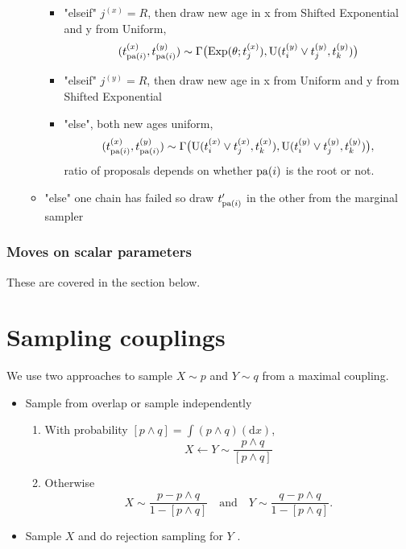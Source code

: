 \documentclass[11pt,a4paper]{article}
\begin{document}
\begin{enumerate}
\begin{itemize}
\begin{itemize}
            \item "elseif" $ j^{(x)} = R $, then draw new age in x from Shifted Exponential and y from Uniform,
            \[
                (t_{\operatorname*{\mathrm{pa}}(i)}^{(x)}, t_{\operatorname*{\mathrm{pa}}(i)}^{(y)}) \sim \Gamma\big(\mathrm{Exp}(\theta; t_j^{(x)}), \mathrm{U}(t_i^{(y)} \vee t_j^{(y)}, t_k^{(y)})\big)
            \]
            \item "elseif" $ j^{(y)} = R $, then draw new age in x from Uniform and y from Shifted Exponential
            \item "else", both new ages uniform,
            \[
                (t_{\operatorname*{\mathrm{pa}}(i)}^{(x)}, t_{\operatorname*{\mathrm{pa}}(i)}^{(y)}) \sim \Gamma\big(\mathrm{U}(t_i^{(x)} \vee t_j^{(x)}, t_k^{(x)}), \mathrm{U}(t_i^{(y)} \vee t_j^{(y)}, t_k^{(y)})\big),
            \]
            ratio of proposals depends on whether $ \operatorname*{\mathrm{pa}}(i) $ is the root or not.
        \end{itemize}
        \item "else" one chain has failed so draw $ t_{\operatorname*{\mathrm{pa}}(i)}' $ in the other from the marginal sampler
    \end{itemize}
\end{enumerate}

\subsubsection{Moves on scalar parameters}

These are covered in the section below.

\section{Sampling couplings}

We use two approaches to sample $ X \sim p $ and $ Y \sim q $ from a maximal coupling.
\begin{itemize}
    \item Sample from overlap or sample independently
    \begin{enumerate}
        \item With probability $ [p \wedge q] = \int (p \wedge q)(\mathrm{d} x) $,
        \[
            X \leftarrow Y \sim \frac{p \wedge q}{[p \wedge q]}
        \]
        \item Otherwise
        \[
            X \sim \frac{p - p \wedge q}{1 - [p \wedge q]}
            \quad \text{and} \quad
            Y \sim \frac{q - p \wedge q}{1 - [p \wedge q]}.
        \]
    \end{enumerate}
    \item Sample $ X $ and do rejection sampling for $ Y $ \citep[Algorithm 2]{jacob20}.
\end{itemize}
\end{document}
